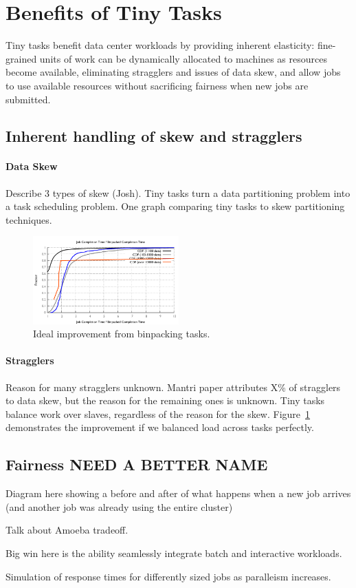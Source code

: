 \section{Benefits of Tiny Tasks}
Tiny tasks benefit data center workloads by providing inherent elasticity:
fine-grained units of work can be dynamically allocated to machines as
resources become available, eliminating stragglers and issues of data skew,
and allow jobs to use available resources without sacrificing fairness
when new jobs are submitted.

\subsection{Inherent handling of skew and stragglers}
\paragraph{Data Skew}
Describe 3 types of skew (Josh). Tiny tasks turn a data partitioning problem into
a task scheduling problem. One graph comparing tiny tasks to skew partitioning
techniques.

\begin{figure}[t]
\centering
\hspace{2ex}
\includegraphics[width=0.5\textwidth]{figures/binpacked1-sep}
\vspace{-4ex}
\caption{Ideal improvement from binpacking tasks.}
\vspace{-2ex}
\label{fig:binpacked}
\end{figure}


\paragraph{Stragglers}
Reason for many stragglers unknown. Mantri paper attributes X\% of stragglers
to data skew, but the reason for the remaining ones is unknown. Tiny tasks
balance work over slaves, regardless of the reason for the skew.
Figure~\ref{fig:binpacked} demonstrates the improvement if we
balanced load across tasks perfectly.

\subsection{Fairness NEED A BETTER NAME}
Diagram here showing a before and after of what happens when a new job arrives
(and another job was already using the entire cluster)

Talk about Amoeba tradeoff.

Big win here is the ability seamlessly integrate batch and interactive workloads.

Simulation of response times for differently sized jobs as paralleism increases.

